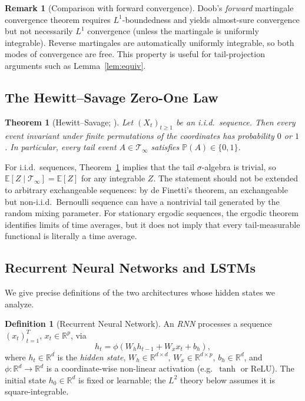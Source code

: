\documentclass[bj,authoryear]{imsart}
\theoremstyle{plain}
\newtheorem{theorem}{Theorem}[section]
\theoremstyle{definition}
\newtheorem{definition}{Definition}[section]
\newtheorem{remark}{Remark}[section]
\newcommand{\E}{\mathbb{E}}
\newcommand{\Prob}{\mathbb{P}}
\newcommand{\R}{\mathbb{R}}
\newcommand{\Tsig}{\mathcal{T}_\infty}
\newcommand{\given}{\mid}
\begin{document}
\begin{remark}[Comparison with forward convergence]
  Doob's \emph{forward} martingale convergence theorem requires $L^1$-boundedness
  and yields almost-sure convergence but not necessarily $L^1$ convergence
  (unless the martingale is uniformly integrable).
  Reverse martingales are automatically uniformly integrable, so both modes of
  convergence are free.  This property is useful for tail-projection arguments such as
  Lemma~\ref{lem:equiv}.
\end{remark}

\subsection{The Hewitt--Savage Zero-One Law}
\label{app:hw}

\begin{theorem}[Hewitt--Savage; \citealt{hewitt1955symmetric}]
\label{thm:hs}
  Let $(X_t)_{t\geq 1}$ be an i.i.d.\ sequence.  Then every event invariant
  under finite permutations of the coordinates has probability $0$ or $1$.
  In particular, every tail event $A\in\Tsig$ satisfies
  $\Prob(A)\in\{0,1\}$.
\end{theorem}

For i.i.d.\ sequences, Theorem~\ref{thm:hs} implies that the tail
$\sigma$-algebra is trivial, so $\E[Z\given\Tsig]=\E[Z]$ for any integrable
$Z$.  The statement should not be extended to arbitrary exchangeable sequences:
by de Finetti's theorem, an exchangeable but non-i.i.d.\ Bernoulli sequence can
have a nontrivial tail generated by the random mixing parameter.  For stationary
ergodic sequences, the ergodic theorem identifies limits of time averages, but
it does not imply that every tail-measurable functional is literally a time
average.

\subsection{Recurrent Neural Networks and LSTMs}

We give precise definitions of the two architectures whose hidden states we analyze.

\begin{definition}[Recurrent Neural Network]
\label{def:rnn}
  An \emph{RNN} processes a sequence $(x_t)_{t=1}^T$, $x_t \in \R^p$, via
  \begin{equation}
    h_t = \phi(W_h h_{t-1} + W_x x_t + b_h),
    \label{eq:rnn}
  \end{equation}
  where $h_t \in \R^d$ is the \emph{hidden state}, $W_h \in \R^{d\times d}$,
  $W_x \in \R^{d\times p}$, $b_h \in \R^d$, and $\phi:\R^d\to\R^d$ is a
  coordinate-wise non-linear activation (e.g.\ $\tanh$ or ReLU).
  The initial state $h_0 \in \R^d$ is fixed or learnable; the $L^2$ theory below assumes it is square-integrable.
\end{definition}
\end{document}
